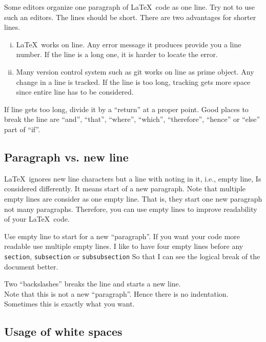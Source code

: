 \documentclass[10pt,journal,compsoc]{IEEEtran}
\newcommand{\hCode}[1]{\texttt{{\footnotesize #1}}}
\theoremstyle{plain}
\theoremstyle{definition}
\theoremstyle{remark}
\begin{document}
Some editors organize one paragraph of \LaTeX\ code as one line.
Try not to use such an editors.
The lines should be short.
There are two advantages for shorter lines.
\begin{enumerate}[i.]

	\item
	\LaTeX\ works on line.
	Any error message it produces provide you a line number. 
	If the line is a long one,
	it is harder to locate the error.

	\item
	Many version control system such as git works on line as prime object.
	Any change in a line is tracked.
	If the line is too long,
	tracking gets more space since entire line has to be considered.

\end{enumerate}
If line gets too long,
divide it by a ``return'' at a proper point.
Good places to break the line are 
``and'', ``that'', ``where'', ``which'', ``therefore'', ``hence''  or ``else'' part of ``if''. 




\subsection{Paragraph vs. new line}

\LaTeX\ ignores new line characters but a line with noting in it, 
i.e., empty line,
Is considered differently.
It means start of a new paragraph.
Note that multiple empty lines are consider as one empty line.
That is, they start one new paragraph not many paragraphs.
Therefore, 
you can use empty lines to improve readability of your \LaTeX\ code.

Use empty line to start for a new ``paragraph''.
If you want your code more readable use multiple empty lines. 
I like to have four empty lines before any 
\hCode{section}, 
\hCode{subsection} or 
\hCode{subsubsection}
So that I can see the logical break of the document better.

Two ``backslashes'' breaks the line and starts a new line.\\
Note that this is not a new ``paragraph''.
Hence there is no indentation.
Sometimes this is exactly what you want.



\subsection{Usage of white spaces}
\end{document}
